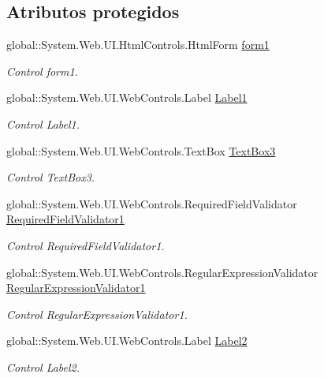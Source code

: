 \subsection*{Atributos protegidos}
\begin{DoxyCompactItemize}
\item 
global\+::\+System.\+Web.\+U\+I.\+Html\+Controls.\+Html\+Form \mbox{\hyperlink{classInicio_1_1Login_a52e65c9e6119c96fb9e7efb178a72214}{form1}}
\begin{DoxyCompactList}\small\item\em Control form1. \end{DoxyCompactList}\item 
global\+::\+System.\+Web.\+U\+I.\+Web\+Controls.\+Label \mbox{\hyperlink{classInicio_1_1Login_a089c50220a66bcedf279557e235b7fb1}{Label1}}
\begin{DoxyCompactList}\small\item\em Control Label1. \end{DoxyCompactList}\item 
global\+::\+System.\+Web.\+U\+I.\+Web\+Controls.\+Text\+Box \mbox{\hyperlink{classInicio_1_1Login_af3c872110454773d5d53d83c27e6ccb6}{Text\+Box3}}
\begin{DoxyCompactList}\small\item\em Control Text\+Box3. \end{DoxyCompactList}\item 
global\+::\+System.\+Web.\+U\+I.\+Web\+Controls.\+Required\+Field\+Validator \mbox{\hyperlink{classInicio_1_1Login_ab86e1edc9ca75591b9305e7c152beb95}{Required\+Field\+Validator1}}
\begin{DoxyCompactList}\small\item\em Control Required\+Field\+Validator1. \end{DoxyCompactList}\item 
global\+::\+System.\+Web.\+U\+I.\+Web\+Controls.\+Regular\+Expression\+Validator \mbox{\hyperlink{classInicio_1_1Login_aebbbf7080d71a07e72e4be45e42c6795}{Regular\+Expression\+Validator1}}
\begin{DoxyCompactList}\small\item\em Control Regular\+Expression\+Validator1. \end{DoxyCompactList}\item 
global\+::\+System.\+Web.\+U\+I.\+Web\+Controls.\+Label \mbox{\hyperlink{classInicio_1_1Login_a88ab7f12f1587cb3a0174d4bdc7baa39}{Label2}}
\begin{DoxyCompactList}\small\item\em Control Label2. \end{DoxyCompactList}\item 

\end{DoxyCompactItemize}
